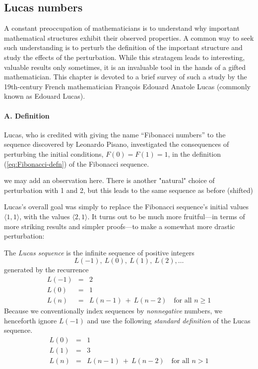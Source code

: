\subsection{Lucas numbers}
\label{sec:Lucas-numbers}

A constant preoccupation of mathematicians is to understand why
important mathematical structures exhibit their observed properties.
A common way to seek such understanding is to perturb the definition
of the important structure and study the effects of the perturbation.
While this stratagem leads to interesting, valuable results only
sometimes, it is an invaluable tool in the hands of a gifted
mathematician.  This chapter is devoted to a brief survey of such a
study by the 19th-century French mathematician Fran\c{c}ois Edouard
Anatole Lucas (commonly known as Edouard Lucas).

\paragraph{\small\sf A. Definition}

Lucas, who is credited with giving the name ``Fibonacci numbers'' to
the sequence discovered by Leonardo Pisano,
investigated the consequences of perturbing the initial conditions,
$F(0) = F(1) = 1$, in the definition (\ref{eq:Fibonacci-defn}) of the
Fibonacci sequence.

{\Denis we may add an observation here. There is another "natural" choice of perturbation with 1 and 2, but this leads to the same sequence as before (shifted)}

Lucas's overall goal was simply to replace the Fibonacci sequence's
initial values $\langle 1,1 \rangle$, with the values $\langle 2,1
\rangle$.  It turns out to be much more fruitful---in terms of more
striking results and simpler proofs---to make a somewhat more drastic
perturbation:

The {\it Lucas sequence}  is the
infinite sequence of positive integers
\[ L(-1), \ L(0), \ L(1), \ L(2), \ldots \]
generated by the recurrence
\begin{eqnarray}
\nonumber
L(-1) & = & 2 \\
\label{eq:Lucas-defn-1}
L(0) & = & 1 \\
\nonumber
L(n) & = & L(n-1) \ + \ L(n-2) \ \ \ \mbox{ for all } n \geq 1
\end{eqnarray}
Because we conventionally index sequences by {\em nonnegative}
numbers, we henceforth ignore $L(-1)$ and use the following {\em
  standard definition} of the Lucas sequence.
\begin{eqnarray}
\nonumber
L(0) & = & 1 \\
\label{eq:Lucas-defn-2}
L(1) & = & 3 \\
\nonumber
L(n) & = & L(n-1) \ + \ L(n-2) \ \ \ \mbox{ for all } n > 1
\end{eqnarray}

